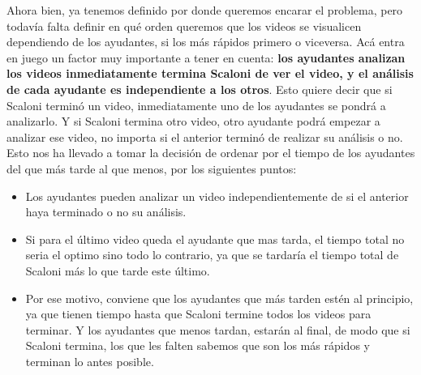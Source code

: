 Ahora bien, ya tenemos definido por donde queremos encarar el problema, pero todavía falta definir en qué orden queremos que los videos se visualicen dependiendo de los ayudantes, si los más rápidos primero o viceversa. Acá entra en juego un factor muy importante a tener en cuenta: \textbf{los ayudantes analizan los videos inmediatamente termina Scaloni de ver el video, y el análisis de cada ayudante es independiente a los otros}. Esto quiere decir que si Scaloni terminó un video, inmediatamente uno de los ayudantes se pondrá a analizarlo. Y si Scaloni termina otro video, otro ayudante podrá empezar a analizar ese video, no importa si el anterior terminó de realizar su análisis o no. Esto nos ha llevado a tomar la decisión de ordenar por el tiempo de los ayudantes del que más tarde al que menos, por los siguientes puntos:
\begin{itemize}
	\item Los ayudantes pueden analizar un video independientemente de si el anterior haya terminado o no su análisis.
	\item Si para el último video queda el ayudante que mas tarda, el tiempo total no seria el optimo sino todo lo contrario, ya que se tardaría el tiempo total de Scaloni más lo que tarde este último.
	\item Por ese motivo, conviene que los ayudantes que más tarden estén al principio, ya que tienen tiempo hasta que Scaloni termine todos los videos para terminar. Y los ayudantes que menos tardan, estarán al final, de modo que si Scaloni termina, los que les falten sabemos que son los más rápidos y terminan lo antes posible.
\end{itemize}
